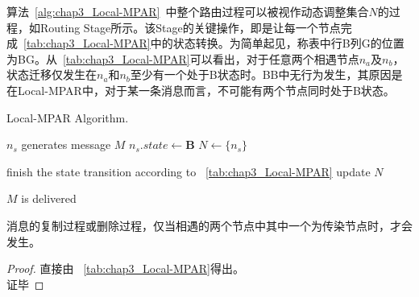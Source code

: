 算法~\ref{alg:chap3_Local-MPAR}~中整个路由过程可以被视作动态调整集合$N$的过程，如Routing Stage所示。该Stage的关键操作，即是让每一个节点完成\tablename~\ref{tab:chap3_Local-MPAR}中的状态转换。为简单起见，称表中行B列G的位置为BG。从\tablename~\ref{tab:chap3_Local-MPAR}可以看出，对于任意两个相遇节点$n_a$及$n_b$，状态迁移仅发生在$n_a$和$n_b$至少有一个处于B状态时。BB中无行为发生，其原因是在Local-MPAR中，对于某一条消息而言，不可能有两个节点同时处于B状态。


\begin{algorithm}[tbp] %
\renewcommand{\algorithmicensure}{\textbf{Initial Stage:}}
\caption{Local-MPAR Algorithm.} %
\label{alg:chap3_Local-MPAR} %
\begin{algorithmic}[1] %
\ENSURE
\STATE $n_s$ generates message $M$
\STATE $n_s.state\leftarrow$\textbf{B}
\STATE $N\leftarrow\{n_s\}$
\end{algorithmic} %
\begin{algorithmic}[1] %
\renewcommand{\algorithmicensure}{\textbf{Routing Stage:}}
\ENSURE
{}
        \STATE finish the state transition according to \tablename~\ref{tab:chap3_Local-MPAR}
        \STATE update $N$
    \ENDIF
\ENDFOR
\end{algorithmic}
\begin{algorithmic}[1]
\renewcommand{\algorithmicensure}{\textbf{End Stage:}}
\ENSURE
\STATE $M$ is delivered
\end{algorithmic}
\end{algorithm}

\begin{lemma}
\label{lemma:infectious}
消息的复制过程或删除过程，仅当相遇的两个节点中其中一个为传染节点时，才会发生。
\end{lemma}
\begin{proof}
直接由 \tablename~\ref{tab:chap3_Local-MPAR}得出。\\
证毕
\end{proof}

